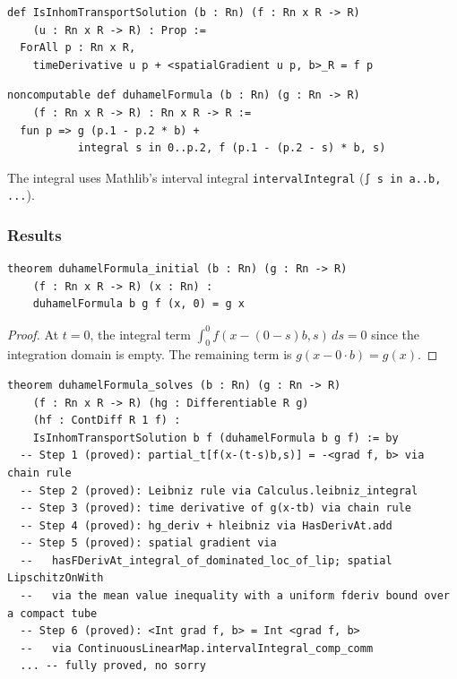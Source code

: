 ﻿\documentclass[12pt, a4paper]{article}
\renewcommand{\_}{\origunderscore\allowbreak}
\theoremstyle{definition}
\theoremstyle{plain}
\begin{document}
\begin{lstlisting}[caption={Inhomogeneous PDE predicate}]
def IsInhomTransportSolution (b : Rn) (f : Rn x R -> R)
    (u : Rn x R -> R) : Prop :=
  ForAll p : Rn x R,
    timeDerivative u p + <spatialGradient u p, b>_R = f p
\end{lstlisting}

\begin{lstlisting}[caption={Duhamel's formula}]
noncomputable def duhamelFormula (b : Rn) (g : Rn -> R)
    (f : Rn x R -> R) : Rn x R -> R :=
  fun p => g (p.1 - p.2 * b) +
           integral s in 0..p.2, f (p.1 - (p.2 - s) * b, s)
\end{lstlisting}

The integral uses Mathlib's interval integral \texttt{intervalIntegral}
(\texttt{∫ s in a..b, ...}).

\subsubsection{Results}

\begin{lstlisting}[caption={Initial condition: integral vanishes at t=0}]
theorem duhamelFormula_initial (b : Rn) (g : Rn -> R)
    (f : Rn x R -> R) (x : Rn) :
    duhamelFormula b g f (x, 0) = g x
\end{lstlisting}

\begin{proof}
At $t = 0$, the integral term $\int_0^0 f(x-(0-s)b, s)\,ds = 0$ since the
integration domain is empty. The remaining term is $g(x - 0 \cdot b) = g(x)$.
\end{proof}

\begin{lstlisting}[caption={Existence (proved)}]
theorem duhamelFormula_solves (b : Rn) (g : Rn -> R)
    (f : Rn x R -> R) (hg : Differentiable R g)
    (hf : ContDiff R 1 f) :
    IsInhomTransportSolution b f (duhamelFormula b g f) := by
  -- Step 1 (proved): partial_t[f(x-(t-s)b,s)] = -<grad f, b> via chain rule
  -- Step 2 (proved): Leibniz rule via Calculus.leibniz_integral
  -- Step 3 (proved): time derivative of g(x-tb) via chain rule
  -- Step 4 (proved): hg_deriv + hleibniz via HasDerivAt.add
  -- Step 5 (proved): spatial gradient via
  --   hasFDerivAt_integral_of_dominated_loc_of_lip; spatial LipschitzOnWith
  --   via the mean value inequality with a uniform fderiv bound over a compact tube
  -- Step 6 (proved): <Int grad f, b> = Int <grad f, b>
  --   via ContinuousLinearMap.intervalIntegral_comp_comm
  ... -- fully proved, no sorry
\end{lstlisting}
\end{document}

